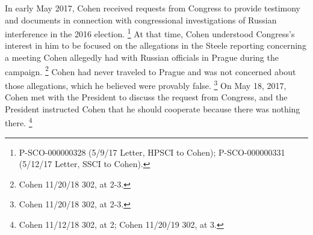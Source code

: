 In early May 2017, Cohen received requests from Congress to provide testimony and documents in connection with congressional investigations of Russian interference in the 2016 election.%
\footnote{P-SCO-000000328 (5/9/17 Letter, HPSCI to Cohen);
P-SCO-000000331 (5/12/17 Letter, SSCI to Cohen).}
At that time, Cohen understood Congress's interest in him to be focused on the allegations in the Steele reporting concerning a meeting Cohen allegedly had with Russian officials in Prague during the campaign.%
\footnote{Cohen 11/20/18 302, at 2-3.}
Cohen had never traveled to Prague and was not concerned about those allegations, which he believed were provably false.%
\footnote{Cohen 11/20/18 302, at 2-3.}
On May 18, 2017, Cohen met with the President to discuss the request from Congress, and the President instructed Cohen that he should cooperate because there was nothing there.%
\footnote{Cohen 11/12/18 302, at 2;
Cohen 11/20/19 302, at 3.}

